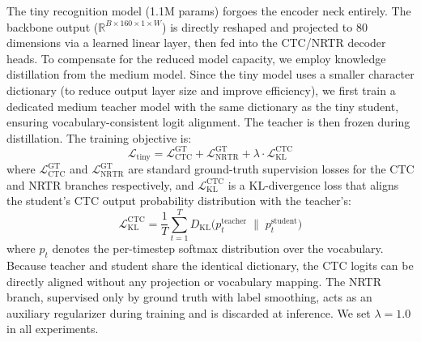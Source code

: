 \documentclass[11pt, a4paper,logo,  copyright, nonumbering]{paddleocr}
\begin{document}
The tiny recognition model (1.1M params) forgoes the encoder neck entirely. The backbone output ($\mathbb{R}^{B \times 160 \times 1 \times W}$) is directly reshaped and projected to 80 dimensions via a learned linear layer, then fed into the CTC/NRTR decoder heads. To compensate for the reduced model capacity, we employ knowledge distillation from the medium model. Since the tiny model uses a smaller character dictionary (to reduce output layer size and improve efficiency), we first train a dedicated medium teacher model with the same dictionary as the tiny student, ensuring vocabulary-consistent logit alignment. The teacher is then frozen during distillation. The training objective is:
\begin{equation}
    \mathcal{L}_{\text{tiny}} = \mathcal{L}_{\text{CTC}}^{\text{GT}} + \mathcal{L}_{\text{NRTR}}^{\text{GT}} + \lambda \cdot \mathcal{L}_{\text{KL}}^{\text{CTC}}
    \label{eq:kd_loss}
\end{equation}
where $\mathcal{L}_{\text{CTC}}^{\text{GT}}$ and $\mathcal{L}_{\text{NRTR}}^{\text{GT}}$ are standard ground-truth supervision losses for the CTC and NRTR branches respectively, and $\mathcal{L}_{\text{KL}}^{\text{CTC}}$ is a KL-divergence loss that aligns the student's CTC output probability distribution with the teacher's:
\begin{equation}
    \mathcal{L}_{\text{KL}}^{\text{CTC}} = \frac{1}{T}\sum_{t=1}^{T} D_{\text{KL}}\big(p_t^{\text{teacher}} \;\|\; p_t^{\text{student}}\big)
    \label{eq:ctc_kl}
\end{equation}
where $p_t$ denotes the per-timestep softmax distribution over the vocabulary. Because teacher and student share the identical dictionary, the CTC logits can be directly aligned without any projection or vocabulary mapping. The NRTR branch, supervised only by ground truth with label smoothing, acts as an auxiliary regularizer during training and is discarded at inference. We set $\lambda{=}1.0$ in all experiments.





\end{document}
